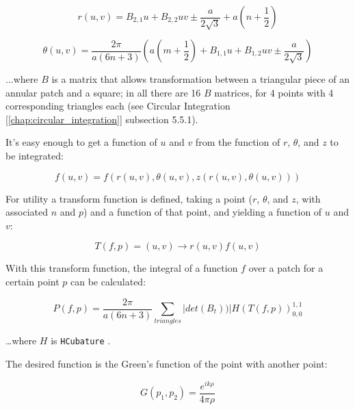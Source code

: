 \documentclass[etd,twoside,senior,noacknowledgments]{BYUPhys}
\begin{document}
\begin{equation}
  r\left(u,v\right)=B_{2,1}u+B_{2,2}uv\pm\frac{a}{2\sqrt{3}}+a\left(n+\frac{1}{2}\right)
\end{equation}

\begin{equation}
  \theta\left(u,v\right)=\frac{2\pi}{a(6n+3)}\left(a\left(m+\frac{1}{2}\right)+B_{1,1}u+B_{1,2}uv\pm\frac{a}{2\sqrt{3}}\right)
\end{equation}

...where $B$ is a matrix that allows transformation between a triangular piece of an annular patch and a square; in all there are 16 $B$ matrices, for 4 points with 4 corresponding triangles each (see Circular Integration [\ref{chap:circular_integration}] subsection 5.5.1).

It's easy enough to get a function of $u$ and $v$ from the function of $r$, $\theta$, and $z$ to be integrated:

\begin{equation}
  f\left(u,v\right)=f\left(r\left(u,v\right),\theta\left(u,v\right),z\left(r\left(u,v\right),\theta\left(u,v\right)\right)\right)
\end{equation}

For utility a transform function is defined, taking a point ($r$, $\theta$, and $z$, with associated $n$ and $p$) and a function of that point, and yielding a function of $u$ and $v$:

\begin{equation}
  T\left(f,p\right)=\left(u,v\right)\rightarrow r\left(u,v\right)f\left(u,v\right)
\end{equation}

With this transform function, the integral of a function $f$ over a patch for a certain point $p$ can be calculated:

\begin{equation}
  P\left(f,p\right)=\frac{2\pi}{a\left(6n+3\right)}\sum_{triangles}|det\left(B_{t}\right))|H\left(T\left(f,p\right)\right)_{0,0}^{1,1}
\end{equation}

\ldots where $H$ is \texttt{HCubature} \cite{HCubature}.

The desired function is the Green's function of the point with another point:

\begin{equation} \label{eq:greens}
  G\left(p_{1},p_{2}\right)=\frac{e^{ik\rho}}{4\pi\rho}
\end{equation}
\end{document}
